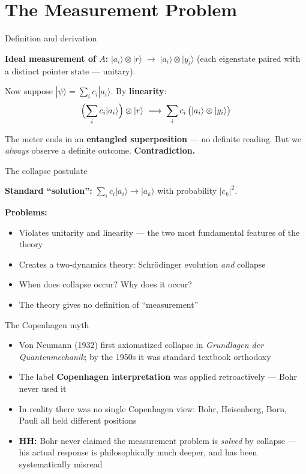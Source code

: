\documentclass[fleql]{beamer}
\newcommand{\kw}[1]{\textbf{#1}}
\newcommand{\ket}[1]{|#1\rangle}
\begin{document}
\section{The Measurement Problem}

\begin{frame}{Definition and derivation}

  \textbf{Ideal measurement of $A$:}
  $\ket{a_i}\otimes\ket{r} \;\longrightarrow\; \ket{a_i}\otimes\ket{y_i}$
  (each eigenstate paired with a distinct pointer state --- unitary).

  \vspace{0.5em}
  Now suppose $\ket{\psi} = \sum_i c_i\ket{a_i}$.
  By \textbf{linearity}:
  \[
  \Bigl(\sum_i c_i\ket{a_i}\Bigr)\otimes\ket{r}
  \;\longrightarrow\;
  \sum_i c_i\,\bigl(\ket{a_i}\otimes\ket{y_i}\bigr)
  \]

  The meter ends in an \textbf{entangled superposition} --- no
  definite reading. But we \emph{always} observe a definite outcome.
  \textbf{Contradiction.}

\end{frame}

\begin{frame}{The collapse postulate}

  \textbf{Standard ``solution'':}
  $\sum_i c_i\ket{a_i} \longrightarrow \ket{a_k}$
  with probability $|c_k|^2$.

  \vspace{0.5em}
  \textbf{Problems:}
  \begin{itemize}
  \item Violates unitarity and linearity --- the two most fundamental
    features of the theory
  \item Creates a two-dynamics theory:
    Schr\"{o}dinger evolution \emph{and} collapse
  \item When does collapse occur? Why does it occur?
  \item The theory gives no definition of ``measurement''
  \end{itemize}

\end{frame}

\begin{frame}{The Copenhagen myth}

  \begin{itemize}
  \item Von Neumann (1932) first axiomatized collapse in
    \emph{Grundlagen der Quantenmechanik}; by the 1950s it was
    standard textbook orthodoxy
  \item The label \kw{Copenhagen interpretation} was applied
    retroactively --- Bohr never used it
  \item In reality there was no single Copenhagen view: Bohr,
    Heisenberg, Born, Pauli all held different positions
  \item \textbf{HH:} Bohr never claimed the measurement problem is
    \emph{solved} by collapse --- his actual response is
    philosophically much deeper, and has been systematically misread
  \end{itemize}

\end{frame}
\end{document}

